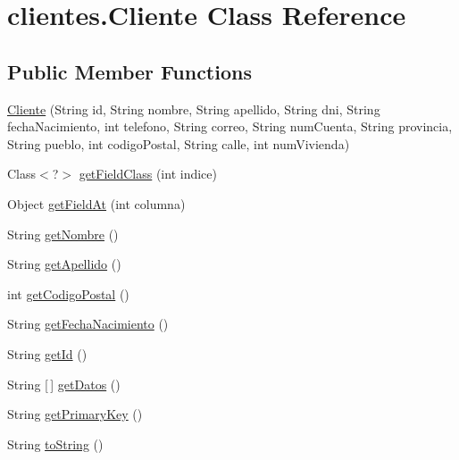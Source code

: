 \hypertarget{classclientes_1_1_cliente}{}\section{clientes.\+Cliente Class Reference}
\label{classclientes_1_1_cliente}
\subsection*{Public Member Functions}
\begin{DoxyCompactItemize}
\item 
\mbox{\hyperlink{classclientes_1_1_cliente_a15501ae37e3b4370b2a73e9fb0581a23}{Cliente}} (String id, String nombre, String apellido, String dni, String fecha\+Nacimiento, int telefono, String correo, String num\+Cuenta, String provincia, String pueblo, int codigo\+Postal, String calle, int num\+Vivienda)
\item 
Class$<$?$>$ \mbox{\hyperlink{classclientes_1_1_cliente_a8c76bd0b8a714475bac4a132e481daec}{get\+Field\+Class}} (int indice)
\item 
Object \mbox{\hyperlink{classclientes_1_1_cliente_a7ec404ddfce7ca5c70e85f005988edc3}{get\+Field\+At}} (int columna)
\item 
String \mbox{\hyperlink{classclientes_1_1_cliente_ace7ec925e4e47251fb01d320b17c95eb}{get\+Nombre}} ()
\item 
String \mbox{\hyperlink{classclientes_1_1_cliente_a2ad0717033efce59b2fc50435cdc40ac}{get\+Apellido}} ()
\item 
int \mbox{\hyperlink{classclientes_1_1_cliente_aef07d8a482516e794ef94a921203fbef}{get\+Codigo\+Postal}} ()
\item 
String \mbox{\hyperlink{classclientes_1_1_cliente_a81caceaa663e94f828969a0ecfb63730}{get\+Fecha\+Nacimiento}} ()
\item 
String \mbox{\hyperlink{classclientes_1_1_cliente_afbd9530580077a88e7b5f0522d56ee6f}{get\+Id}} ()
\item 
String \mbox{[}$\,$\mbox{]} \mbox{\hyperlink{classclientes_1_1_cliente_a3fe03993034c7fd7ca5a3433a3543508}{get\+Datos}} ()
\item 
String \mbox{\hyperlink{classclientes_1_1_cliente_afe1b2756b16dc23224805400ef1125d3}{get\+Primary\+Key}} ()
\item 
String \mbox{\hyperlink{classclientes_1_1_cliente_a1bcd093234a348d3471ab95a1c58fa8c}{to\+String}} ()
\end{DoxyCompactItemize}
